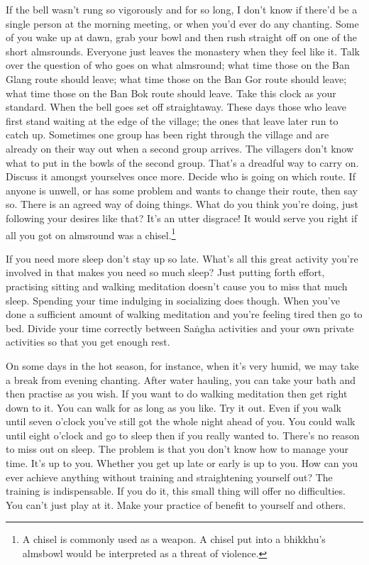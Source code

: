 If the bell wasn't rung so vigorously and for so long, I don't know if there'd be a single person at the morning meeting, or when you'd ever do any chanting. Some of you wake up at dawn, grab your bowl and then rush straight off on one of the short almsrounds. Everyone just leaves the monastery when they feel like it. Talk over the question of who goes on what almsround; what time those on the Ban Glang route should leave; what time those on the Ban Gor route should leave; what time those on the Ban Bok route should leave. Take this clock as your standard. When the bell goes set off straightaway. These days those who leave first stand waiting at the edge of the village; the ones that leave later run to catch up. Sometimes one group has been right through the village and are already on their way out when a second group arrives. The villagers don't know what to put in the bowls of the second group. That's a dreadful way to carry on. Discuss it amongst yourselves once more. Decide who is going on which route. If anyone is unwell, or has some problem and wants to change their route, then say so. There is an agreed way of doing things. What do you think you're doing, just following your desires like that? It's an utter disgrace! It would serve you right if all you got on almsround was a chisel.\footnote{A chisel is commonly used as a weapon. A chisel put into a bhikkhu's almsbowl would be interpreted as a threat of violence.}

If you need more sleep don't stay up so late. What's all this great activity you're involved in that makes you need so much sleep? Just putting forth effort, practising sitting and walking meditation doesn't cause you to miss that much sleep. Spending your time indulging in socializing does though. When you've done a sufficient amount of walking meditation and you're feeling tired then go to bed. Divide your time correctly between Sa\.ngha activities and your own private activities so that you get enough rest.

On some days in the hot season, for instance, when it's very humid, we may take a break from evening chanting. After water hauling, you can take your bath and then practise as you wish. If you want to do walking meditation then get right down to it. You can walk for as long as you like. Try it out. Even if you walk until seven o'clock you've still got the whole night ahead of you. You could walk until eight o'clock and go to sleep then if you really wanted to. There's no reason to miss out on sleep. The problem is that you don't know how to manage your time. It's up to you. Whether you get up late or early is up to you. How can you ever achieve anything without training and straightening yourself out? The training is indispensable. If you do it, this small thing will offer no difficulties. You can't just play at it. Make your practice of benefit to yourself and others.

